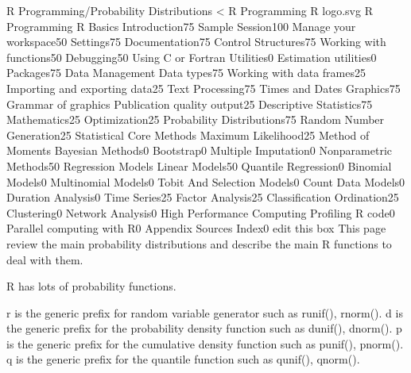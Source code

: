 \documentclass[12pt, a4paper]{article}
\theoremstyle{plain}
\theoremstyle{definition}
\theoremstyle{remark}
\begin{document}
R Programming/Probability Distributions
< R Programming
R logo.svg
R Programming
R Basics
Introduction75%
Sample Session100%
Manage your workspace50%
Settings75%
Documentation75%
Control Structures75%
Working with functions50%
Debugging50%
Using C or Fortran
Utilities0%
Estimation utilities0%
Packages75%
Data Management
Data types75%
Working with data frames25%
Importing and exporting data25%
Text Processing75%
Times and Dates
Graphics75%
Grammar of graphics
Publication quality output25%
Descriptive Statistics75%
Mathematics25%
Optimization25%
Probability Distributions75%
Random Number Generation25%
Statistical Core Methods
Maximum Likelihood25%
Method of Moments
Bayesian Methods0%
Bootstrap0%
Multiple Imputation0%
Nonparametric Methods50%
Regression Models
Linear Models50%
Quantile Regression0%
Binomial Models0%
Multinomial Models0%
Tobit And Selection Models0%
Count Data Models0%
Duration Analysis0%
Time Series25%
Factor Analysis25%
Classification
Ordination25%
Clustering0%
Network Analysis0%
High Performance Computing
Profiling R code0%
Parallel computing with R0%
Appendix
Sources
Index0%
edit this box
This page review the main probability distributions and describe the main R functions to deal with them.

R has lots of probability functions.

r is the generic prefix for random variable generator such as runif(), rnorm().
d is the generic prefix for the probability density function such as dunif(), dnorm().
p is the generic prefix for the cumulative density function such as punif(), pnorm().
q is the generic prefix for the quantile function such as qunif(), qnorm().
\end{document}
